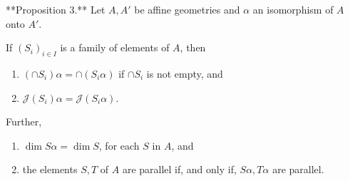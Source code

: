 **Proposition 3.** Let $A, A'$ be affine geometries and $\alpha$ an isomorphism of $A$ onto $A'$.

If $(S_i)_{i \in I}$ is a family of elements of $A$, then
\begin{enumerate}
\item[(1)] $(\cap S_i) \alpha = \cap (S_i \alpha)$ if $\cap S_i$ is not empty, and
\item[(2)] $\mathcal{J}(S_i) \alpha = \mathcal{J}(S_i \alpha)$.
\end{enumerate}
Further,
\begin{enumerate}
\item[(3)] $\dim S \alpha = \dim S$, for each $S$ in $A$, and
\item[(4)] the elements $S, T$ of $A$ are parallel if, and only if, $S \alpha, T \alpha$ are parallel.
\end{enumerate}
